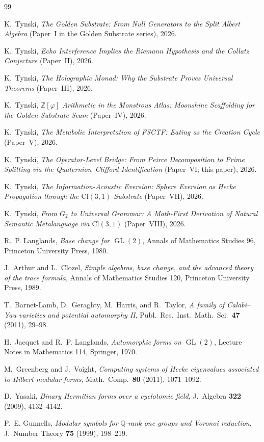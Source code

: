 \documentclass[11pt,a4paper]{article}
\theoremstyle{plain}
\theoremstyle{definition}
\theoremstyle{remark}
\numberwithin{equation}{section}
\providecommand{\Cl}{\mathrm{Cl}}
\providecommand{\ZZ}{\mathbb{Z}}
\providecommand{\QQ}{\mathbb{Q}}
\providecommand{\GL}{\operatorname{GL}}
\begin{document}
\begin{thebibliography}{99}


K.~Tynski,
\emph{The Golden Substrate: From Null Generators to the Split Albert
Algebra} (Paper~I in the Golden Substrate series), 2026.

K.~Tynski,
\emph{Echo Interference Implies the Riemann Hypothesis and the Collatz
Conjecture} (Paper~II), 2026.

K.~Tynski,
\emph{The Holographic Monad: Why the Substrate Proves Universal Theorems}
(Paper~III), 2026.

K.~Tynski,
\emph{$\ZZ[\varphi]$ Arithmetic in the Monstrous Atlas: Moonshine
Scaffolding for the Golden Substrate Seam} (Paper~IV), 2026.

K.~Tynski,
\emph{The Metabolic Interpretation of FSCTF: Eating as the Creation Cycle}
(Paper~V), 2026.

K.~Tynski,
\emph{The Operator-Level Bridge: From Peirce Decomposition to Prime
Splitting via the Quaternion--Clifford Identification} (Paper~VI;
this paper), 2026.

K.~Tynski,
\emph{The Information-Acoustic Eversion: Sphere Eversion as Hecke
Propagation through the $\Cl(3,1)$ Substrate} (Paper~VII), 2026.

K.~Tynski,
\emph{From $G_2$ to Universal Grammar: A Math-First Derivation of Natural
Semantic Metalanguage via $\Cl(3,1)$} (Paper~VIII), 2026.


R.~P. Langlands, \emph{Base change for $\GL(2)$}, Annals of Mathematics
Studies 96, Princeton University Press, 1980.

J.~Arthur and L.~Clozel, \emph{Simple algebras, base change, and the
advanced theory of the trace formula}, Annals of Mathematics Studies 120,
Princeton University Press, 1989.

T.~Barnet-Lamb, D.~Geraghty, M.~Harris, and R.~Taylor,
\emph{A family of Calabi--Yau varieties and potential automorphy II},
Publ.\ Res.\ Inst.\ Math.\ Sci.\ \textbf{47} (2011), 29--98.

H.~Jacquet and R.~P. Langlands, \emph{Automorphic forms on $\GL(2)$},
Lecture Notes in Mathematics 114, Springer, 1970.

M.~Greenberg and J.~Voight, \emph{Computing systems of Hecke eigenvalues
associated to Hilbert modular forms},
Math.\ Comp.\ \textbf{80} (2011), 1071--1092.

D.~Yasaki, \emph{Binary Hermitian forms over a cyclotomic field},
J.\ Algebra \textbf{322} (2009), 4132--4142.

P.~E. Gunnells, \emph{Modular symbols for $\QQ$-rank one groups and
Voronoi reduction}, J.\ Number Theory \textbf{75} (1999), 198--219.

\end{thebibliography}
\end{document}
